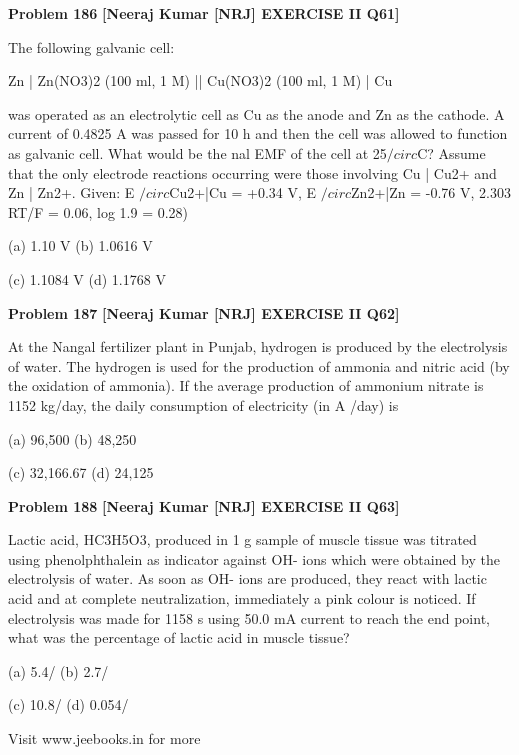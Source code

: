 \begin{problembox}
\textbf{Problem 186} \hfill \textbf{[Neeraj Kumar [NRJ] EXERCISE II Q61]}
\label{q:ext-nrj_all_questions-186}

The following galvanic cell:
 
   Zn | Zn(NO3)2 (100 ml, 1 M) || Cu(NO3)2 (100 
ml, 1 M) | Cu
 
 was operated as an electrolytic cell as Cu as 
the anode and Zn as the cathode. A current 
of 0.4825 A was passed for 10 h and then the 
cell was allowed to function as galvanic cell. 
What would be the   nal EMF of the cell at 
25$/circ$C? Assume that the only electrode reactions 
occurring were those involving Cu | Cu2+ and 
Zn | Zn2+. Given: E $/circ$Cu2+|Cu = +0.34 V, E $/circ$Zn2+|Zn 
= -0.76 V, 2.303 RT/F = 0.06, log 1.9 = 0.28)
 
 (a) 1.10 V 
(b) 1.0616 V
 
 (c) 1.1084 V 
(d) 1.1768 V
\end{problembox}

\begin{problembox}
\textbf{Problem 187} \hfill \textbf{[Neeraj Kumar [NRJ] EXERCISE II Q62]}
\label{q:ext-nrj_all_questions-187}

At the Nangal fertilizer plant in Punjab, hydrogen 
is produced by the electrolysis of water. The 
hydrogen is used for the production of ammonia 
and nitric acid (by the oxidation of ammonia). If 
the average production of ammonium nitrate is 
1152 kg/day, the daily consumption of electricity 
(in A /day) is
 
 (a) 96,500 
(b) 48,250
 
 (c) 32,166.67 
(d) 24,125
\end{problembox}

\begin{problembox}
\textbf{Problem 188} \hfill \textbf{[Neeraj Kumar [NRJ] EXERCISE II Q63]}
\label{q:ext-nrj_all_questions-188}

Lactic acid, HC3H5O3, produced in 1 g sample of 
muscle tissue was titrated using phenolphthalein 
as indicator against OH- ions which were obtained 
by the electrolysis of water. As soon as OH- ions 
are produced, they react with lactic acid and at 
complete neutralization, immediately a pink colour 
is noticed. If electrolysis was made for 1158 s using 
50.0 mA current to reach the end point, what was 
the percentage of lactic acid in muscle  tissue?
 
 (a) 5.4/%
(b) 2.7/%
 
 (c) 10.8/%
(d) 0.054/%
 
 
Visit www.jeebooks.in for more
\end{problembox}

